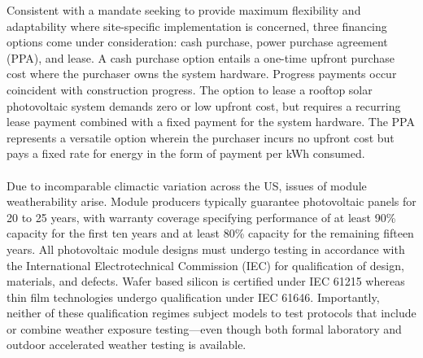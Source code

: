 Consistent with a mandate seeking to provide maximum flexibility and adaptability where site-specific implementation is concerned, three financing options come under consideration: cash purchase, power purchase agreement (PPA), and lease. A cash purchase option entails a one-time upfront purchase cost where the purchaser owns the system hardware. Progress payments occur coincident with construction progress. The option to lease a rooftop solar photovoltaic system demands zero or low upfront cost, but requires a recurring lease payment combined with a fixed payment for the system hardware. The PPA represents a versatile option wherein the purchaser incurs no upfront cost but pays a fixed rate for energy in the form of payment per kWh consumed.
\\\\
\noindent Due to incomparable climactic variation across the US, issues of module weatherability arise. Module producers typically guarantee photovoltaic panels for 20 to 25 years, with warranty coverage specifying performance of at least 90\% capacity for the first ten years and at least 80\% capacity for the remaining fifteen years. All photovoltaic module designs must undergo testing in accordance with the International Electrotechnical Commission (IEC) for qualification of design, materials, and defects. Wafer based silicon is certified under IEC 61215 whereas thin film technologies undergo qualification under IEC 61646. Importantly, neither of these qualification regimes subject models to test protocols that include or combine weather exposure testing—even though both formal laboratory and outdoor accelerated weather testing is available.


